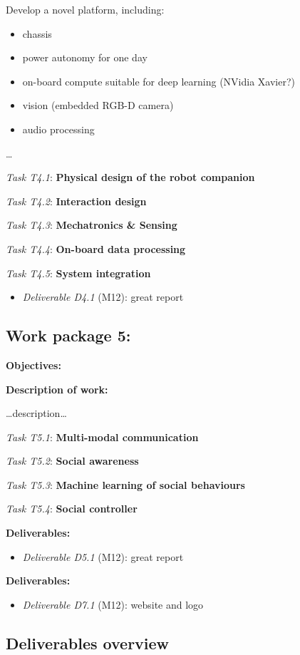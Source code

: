 \documentclass[11pt]{report}
\newcommand{\task}[2]{\vspace{0.5cm}\noindent\emph{Task T#1}: {\bf #2}\par}
\newcommand{\D}[3]{\emph{Deliverable D#1} (M#2): #3\\}
\begin{document}
Develop a novel platform, including:

\begin{itemize}
    \item chassis
    \item power autonomy for one day
    \item on-board compute suitable for deep learning (NVidia Xavier?)
    \item vision (embedded RGB-D camera)
    \item audio processing
\end{itemize}

\ldots{}

\task{4.1}{Physical design of the robot companion}
\task{4.2}{Interaction design}
\task{4.3}{Mechatronics \& Sensing}
\task{4.4}{On-board data processing}
\task{4.5}{System integration}

\begin{itemize}
    \item \D{4.1}{12}{great report}
\end{itemize}

\subsection{Work package 5: \wpFive}


\textbf{Objectives:}

\textbf{Description of work:}

\ldots{}description\ldots{}

\task{5.1}{Multi-modal communication}
\task{5.2}{Social awareness}
\task{5.3}{Machine learning of social behaviours}
\task{5.4}{Social controller}

\vspace{0.5cm}\textbf{Deliverables:}

\begin{itemize}
    \item \D{5.1}{12}{great report}
\end{itemize}

\vspace{0.5cm}\textbf{Deliverables:}

\begin{itemize}
    \item \D{7.1}{12}{website and logo}
\end{itemize}


\subsection{Deliverables overview}\label{deliverables-overview}
\end{document}
